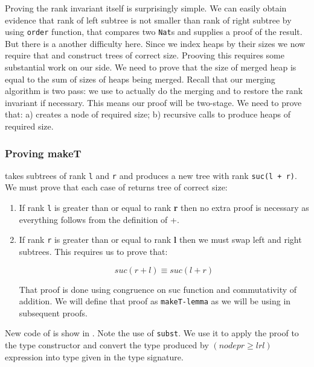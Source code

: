 Proving the rank invariant itself is surprisingly simple. We can easily obtain evidence that rank of left subtree is not smaller than rank of right subtree by using \texttt{order} function, that compares two \texttt{Nat}s and supplies a proof of the result. But there is a another difficulty here. Since we index heaps by their sizes we now require that \makeT and \merge construct trees of correct size. Prooving this requires some substantial work on our side. We need to prove that the size of merged heap is equal to the sum of sizes of heaps being merged. Recall that our merging algorithm is two pass: we use \merge to actually do the merging and \makeT to
restore the rank invariant if necessary. This means our proof will be two-stage. We need to prove that: a) \makeT creates a node of required size; b) recursive calls to \merge produce heaps of required size.

\subsubsection{Proving makeT}

\makeT takes subtrees of rank \texttt{l} and \texttt{r} and produces a new tree with rank \texttt{suc(l + r)}. We must prove that each case of \makeT returns tree of correct size:

\begin{enumerate}
 \item If rank \texttt{l} is greater than or equal to rank \textbf{r} then no extra proof is necessary as everything follows from the definition of +.
 \item If rank \texttt{r} is greater than or equal to rank \textbf{l} then we must swap left and right subtrees. This requires us to prove that:

\begin{equation*}
suc (r + l) ≡ suc (l + r)
\end{equation*}

That proof is done using congruence on suc function and commutativity of addition. We will define that proof as \texttt{makeT-lemma} as we will be using in subsequent proofs.
\end{enumerate}

New code of \makeT is show in . Note the use of \texttt{subst}. We use it to apply the proof to the \Heap type constructor and convert the type produced by $(node p r≥l r l)$ expression into type given in the type signature. %

